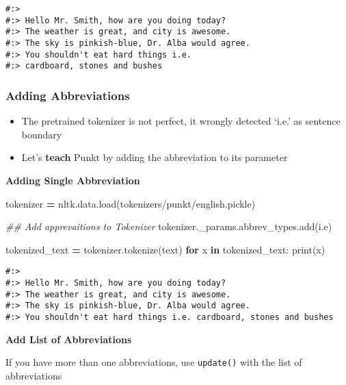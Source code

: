 \documentclass[
]{book}
\newenvironment{Shaded}{\begin{snugshade}}{\end{snugshade}}
\newcommand{\BuiltInTok}[1]{#1}
\newcommand{\CommentTok}[1]{\textcolor[rgb]{0.37,0.37,0.37}{\textit{#1}}}
\newcommand{\ControlFlowTok}[1]{\textcolor[rgb]{0.27,0.27,0.27}{\textbf{#1}}}
\newcommand{\KeywordTok}[1]{\textcolor[rgb]{0.27,0.27,0.27}{\textbf{#1}}}
\newcommand{\NormalTok}[1]{#1}
\newcommand{\OperatorTok}[1]{\textcolor[rgb]{0.43,0.43,0.43}{\textbf{#1}}}
\newcommand{\StringTok}[1]{\textcolor[rgb]{0.5,0.5,0.5}{#1}}
\providecommand{\tightlist}{%
  \setlength{\itemsep}{0pt}\setlength{\parskip}{0pt}}
\begin{document}
\begin{verbatim}
#:> 
#:> Hello Mr. Smith, how are you doing today?
#:> The weather is great, and city is awesome.
#:> The sky is pinkish-blue, Dr. Alba would agree.
#:> You shouldn't eat hard things i.e.
#:> cardboard, stones and bushes
\end{verbatim}

\hypertarget{adding-abbreviations}{%
\subsubsection{Adding Abbreviations}\label{adding-abbreviations}}

\begin{itemize}
\tightlist
\item
  The pretrained tokenizer is not perfect, it wrongly detected `i.e.' as sentence boundary\\
\item
  Let's \textbf{teach} Punkt by adding the abbreviation to its parameter
\end{itemize}

\textbf{Adding Single Abbreviation}

\begin{Shaded}
\begin{Highlighting}[]

\NormalTok{tokenizer      }\OperatorTok{=}\NormalTok{ nltk.data.load(}\StringTok{\textquotesingle{}tokenizers/punkt/english.pickle\textquotesingle{}}\NormalTok{)}

\CommentTok{\#\# Add apprevaitions to Tokenizer}
\NormalTok{tokenizer.\_params.abbrev\_types.add(}\StringTok{\textquotesingle{}i.e\textquotesingle{}}\NormalTok{)}

\NormalTok{tokenized\_text }\OperatorTok{=}\NormalTok{ tokenizer.tokenize(text) }
\ControlFlowTok{for}\NormalTok{ x }\KeywordTok{in}\NormalTok{ tokenized\_text:}
  \BuiltInTok{print}\NormalTok{(x)}
\end{Highlighting}
\end{Shaded}

\begin{verbatim}
#:> 
#:> Hello Mr. Smith, how are you doing today?
#:> The weather is great, and city is awesome.
#:> The sky is pinkish-blue, Dr. Alba would agree.
#:> You shouldn't eat hard things i.e. cardboard, stones and bushes
\end{verbatim}

\textbf{Add List of Abbreviations}

If you have more than one abbreviations, use \texttt{update()} with the list of abbreviations
\end{document}
